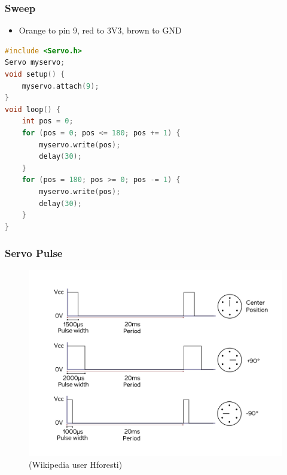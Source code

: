 \documentclass[compress, aspectratio=32]{beamer}
\begin{document}
\begin{frame}[fragile]
    \frametitle{Sweep}
    \begin{itemize}
        \item Orange to pin 9, red to 3V3, brown to GND
    \end{itemize}
    \begin{lstlisting}[language=c]
#include <Servo.h>
Servo myservo;
void setup() {
    myservo.attach(9);
}
void loop() {
    int pos = 0;
    for (pos = 0; pos <= 180; pos += 1) {  
        myservo.write(pos);  
        delay(30);           
    }
    for (pos = 180; pos >= 0; pos -= 1) {  
        myservo.write(pos);                  
        delay(30);
    }
}
    \end{lstlisting}
\end{frame}
\begin{frame}
    \frametitle{Servo Pulse}
    \begin{figure}
        \includegraphics[height=0.7\textheight]{Servomotor_Timing_Diagram.jpg}  
        \centering
        \caption*{(Wikipedia user Hforesti)}
    \end{figure}
\end{frame}
\end{document}
